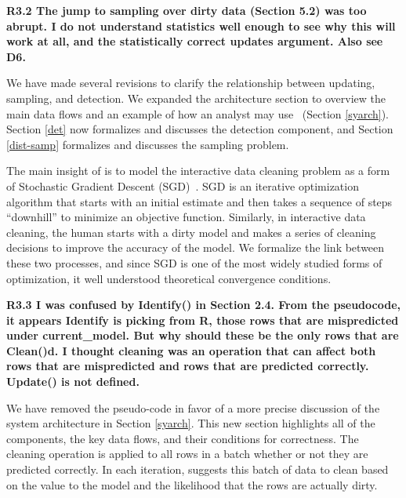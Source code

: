 \vspace{0.5em}

\noindent\textbf{R3.2 The jump to sampling over dirty data (Section 5.2) was too abrupt.
I do not understand statistics well enough to see why this will work at all,
and the statistically correct updates argument. Also see D6.}

\noindent  We have made several revisions to clarify the relationship between updating, sampling, and detection. We expanded the architecture section to overview the main data flows and an example of how an analyst may use \sys~(Section \ref{syarch}). Section \ref{det} now formalizes and discusses the detection component, and Section \ref{dist-samp} formalizes and discusses the sampling problem.

The main insight of \sys is to model the interactive data cleaning problem as a form of Stochastic Gradient Descent (SGD)~\cite{bottou2012stochastic}.
SGD is an iterative optimization algorithm that starts with an initial estimate and then takes a sequence of steps ``downhill'' to minimize an objective function.
Similarly, in interactive data cleaning, the human starts with a dirty model and makes a series of cleaning decisions to improve the accuracy of the model.
We formalize the link between these two processes, and since SGD is one of the most widely studied forms of optimization, it well understood theoretical convergence conditions.


\vspace{0.5em}

\noindent \textbf{R3.3 I was confused by Identify() in Section 2.4.
From the pseudocode, it appears Identify is picking from R,
those rows that are mispredicted under current\_model.
But why should these be the only rows that are Clean()d.
I thought cleaning was an operation that can
affect both rows that are mispredicted and rows that
are predicted correctly. Update() is not defined.}

\noindent  We have removed the pseudo-code in favor of a more precise discussion of the system architecture in Section \ref{syarch}. This new section highlights all of the components, the key data flows, and their conditions for correctness. 
The cleaning operation is applied to all rows in a batch whether or not they are predicted correctly.
In each iteration, \sys suggests this batch of data to clean based on the value to the model and the likelihood that the rows are actually dirty.

\vspace{0.5em}

